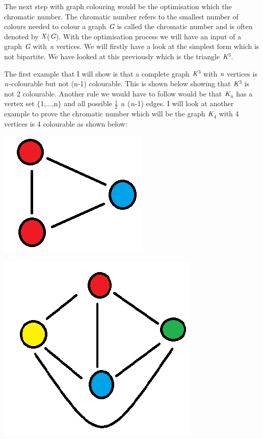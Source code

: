 \documentclass[a4paper]{report}
\begin{document}
\vspace{3mm}
The next step with graph colouring would be the optimisation which the chromatic number. The chromatic number refers to the smallest number of colours needed to colour a graph $\emph{G}$ is called the chromatic number and is often denoted by $\emph{X}$($\emph{G}$). With the optimisation process we will have an input of a graph $\emph{G}$ with $\emph{n}$ vertices. We will firstly have a look at the simplest form which is not bipartite. We have looked at this previously which is the triangle $\emph{K}$$^{3}$.

\vspace{3mm}
The first example that I will show is that a complete graph $\emph{K}$$^{3}$ with $\emph{n}$ vertices is $\emph{n}$-colourable but not (n-1) colourable. This is shown below showing that $\emph{K}$$^{3}$ is not 2 colourable. Another rule we would have to follow would be that $\emph{K}$$_{n}$ has a vertex set $\lbrace$1,...,n$\rbrace$ and all possible $\frac{1}{2}$ $\emph{n}$ ($\emph{n}$-1) edges. I will look at another example to prove the chromatic number which will be the graph $\emph{K}$$_{4}$ with 4 vertices is 4 colourable as shown below:

\begin{center}
\includegraphics[scale=0.60]{not3colouring.png}
\end{center}

\vspace{3mm}

\begin{center}
\includegraphics[scale=0.60]{4colouring.png}
\end{center}
\end{document}
